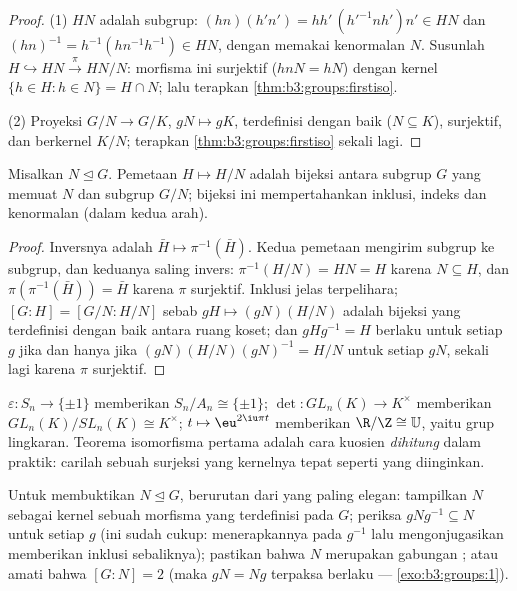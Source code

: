\begin{proof}
(1) $HN$ adalah subgrup: $(hn)(h'n') = hh'\,(h'^{-1}nh')n' \in HN$
dan $(hn)^{-1} = h^{-1}(hn^{-1}h^{-1}) \in HN$, dengan memakai kenormalan
$N$. Susunlah $H \hookrightarrow HN \xrightarrow{\pi} HN/N$: morfisma
ini surjektif ($hnN = hN$) dengan kernel $\{h \in H : h \in
N\} = H \cap N$; lalu terapkan \cref{thm:b3:groups:firstiso}.

(2) Proyeksi $G/N \to G/K$, $gN \mapsto gK$, terdefinisi dengan baik
($N \subseteq K$), surjektif, dan berkernel $K/N$; terapkan
\cref{thm:b3:groups:firstiso} sekali lagi.
\end{proof}

\begin{theorem}\label{thm:b3:groups:correspondence}
Misalkan $N \trianglelefteq G$. Pemetaan $H \mapsto H/N$ adalah bijeksi
antara subgrup $G$ yang memuat $N$ dan subgrup $G/N$; bijeksi ini
mempertahankan inklusi, indeks dan kenormalan (dalam kedua arah).
\end{theorem}

\begin{proof}
Inversnya adalah $\bar H \mapsto \pi^{-1}(\bar H)$. Kedua pemetaan mengirim
subgrup ke subgrup, dan keduanya saling invers: $\pi^{-1}(H/N) =
HN = H$ karena $N \subseteq H$, dan $\pi(\pi^{-1}(\bar H)) = \bar H$
karena $\pi$ surjektif. Inklusi jelas terpelihara;
$[G:H] = [G/N : H/N]$ sebab $gH \mapsto (gN)(H/N)$ adalah bijeksi
yang terdefinisi dengan baik antara ruang koset; dan $gHg^{-1} = H$ berlaku untuk
setiap $g$ jika dan hanya jika $(gN)(H/N)(gN)^{-1} = H/N$ untuk setiap $gN$, sekali lagi
karena $\pi$ surjektif.
\end{proof}

\begin{example}\label{ex:b3:groups:firstiso}
$\varepsilon \colon S_n \to \{\pm 1\}$ memberikan $S_n/A_n \cong
\{\pm1\}$; $\det \colon GL_n(K) \to K^\times$ memberikan
$GL_n(K)/SL_n(K) \cong K^\times$; $t \mapsto \eu^{2\iu\pi t}$ memberikan
$\R/\Z \cong \mathbb U$, yaitu grup lingkaran. Teorema isomorfisma
pertama adalah cara kuosien \emph{dihitung} dalam praktik: carilah
sebuah surjeksi yang kernelnya tepat seperti yang diinginkan.
\end{example}

\begin{method}\label{met:b3:groups:normal}
Untuk membuktikan $N \trianglelefteq G$, berurutan dari yang paling elegan:
tampilkan $N$ sebagai kernel sebuah morfisma yang terdefinisi pada $G$; periksa
$gNg^{-1} \subseteq N$ untuk setiap $g$ (ini sudah cukup: menerapkannya pada
$g^{-1}$ lalu mengonjugasikan memberikan inklusi sebaliknya); pastikan bahwa
$N$ merupakan gabungan ; atau amati bahwa $[G:N] = 2$
(maka $gN = Ng$ terpaksa berlaku --- \cref{exo:b3:groups:1}).
\end{method}

